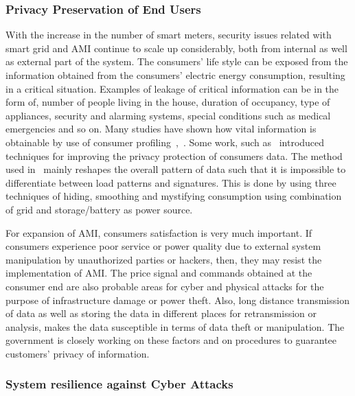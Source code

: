 \subsubsection{Privacy Preservation of End Users}

With the increase in the number of smart meters, security issues related with smart grid and AMI continue to scale up considerably, both from internal as well as external part of the system. The consumers' life style can be exposed from the information obtained from the consumers' electric energy consumption, resulting in a critical situation. Examples of leakage of critical information can be in the form of, number of people living in the house, duration of occupancy, type of appliances, security and alarming systems, special conditions such as medical emergencies and so on. Many studies have shown how vital information is obtainable by use of consumer profiling~\cite{Murrill12},~\cite{Molina-Markham10}. Some work, such as~\cite{Kalogridis10} introduced techniques for improving the privacy protection of consumers data. The method used in~\cite{Kalogridis10} mainly reshapes the overall pattern of data such that it is impossible to differentiate between load patterns and signatures. This is done by using three techniques of hiding, smoothing and mystifying consumption using combination of grid and storage/battery as power source. \par For expansion of AMI, consumers satisfaction is very much important. If consumers experience poor service or power quality due to external system manipulation by unauthorized parties or hackers, then, they may resist the implementation of AMI. The price signal and commands obtained at the consumer end are also probable areas for cyber and physical attacks for the purpose of infrastructure damage or power theft. Also, long distance transmission of data as well as storing the data in different places for retransmission or analysis, makes the data susceptible in terms of data theft or manipulation. The government is closely working on these factors and on procedures to guarantee customers’ privacy of information. 

\subsubsection{System resilience against Cyber Attacks}

